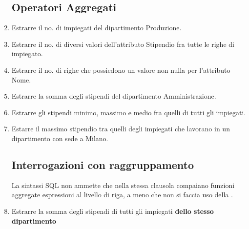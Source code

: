 \begin{enumerate}

\newpage
\subsection*{Operatori Aggregati}

\setcounter{enumi}{19}
	\item Estrarre il no. di impiegati del dipartimento Produzione.
	

	\item Estrarre il no. di diversi valori dell'attributo Stipendio fra tutte le righe di impiegato.
	

	\item Estrarre il no. di righe che possiedono un valore non nulla per l'attributo Nome.
	

	\item Estrarre la somma degli stipendi del dipartimento Amministrazione.
	

	\item Estrarre gli stipendi minimo, massimo e medio fra quelli di tutti gli impiegati.
	

	\item Estarre il massimo stipendio tra quelli degli impiegati che lavorano in un dipartimento con sede a Milano.
	


\newpage
\subsection*{Interrogazioni con raggruppamento}

La sintassi SQL non ammette che nella stessa clausola  compaiano funzioni aggregate espressioni al livello di riga, a meno che non si faccia uso della .

\setcounter{enumi}{26}
	\item Estrarre la somma degli stipendi {\btHL di tutti gli impiegati \textbf{dello stesso dipartimento}}
	


\end{enumerate}
